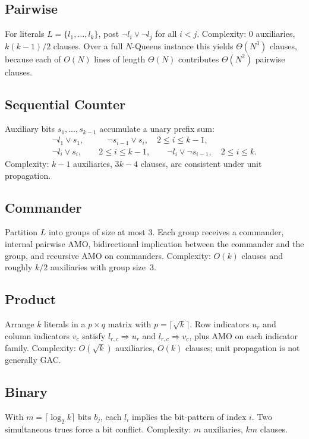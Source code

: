 \documentclass[a4paper,fleqn]{cas-sc}
\begin{document}
\subsection{Pairwise}
For literals $L=\{l_1,\dots,l_k\}$, post $\neg l_i\lor\neg l_j$ for all $i<j$.
Complexity: $0$ auxiliaries, $k(k-1)/2$ clauses.
Over a full $N$-Queens instance this yields $\Theta(N^3)$ clauses, because each of $O(N)$ lines of length $\Theta(N)$ contributes $\Theta(N^2)$ pairwise clauses.

\subsection{Sequential Counter~\cite{sinz2005towards}}
Auxiliary bits $s_1,\dots,s_{k-1}$ accumulate a unary prefix sum:
\begin{align}
\neg l_1\lor s_1, &\qquad
\neg s_{i-1}\lor s_i, \quad 2\le i\le k-1,\\
\neg l_i\lor s_i, &\quad 2\le i\le k-1, \qquad
\neg l_i\lor \neg s_{i-1}, \quad 2\le i\le k.
\end{align}
Complexity: $k-1$ auxiliaries, $3k-4$ clauses, arc consistent under unit propagation.

\subsection{Commander~\cite{klieber2007commander}}
Partition $L$ into groups of size at most $3$.
Each group receives a commander, internal pairwise AMO, bidirectional implication between the commander and the group, and recursive AMO on commanders.
Complexity: $O(k)$ clauses and roughly $k/2$ auxiliaries with group size~$3$.

\subsection{Product~\cite{chen2010new}}
Arrange $k$ literals in a $p\times q$ matrix with $p=\lceil\sqrt{k}\rceil$.
Row indicators $u_r$ and column indicators $v_c$ satisfy $l_{r,c}\Rightarrow u_r$ and $l_{r,c}\Rightarrow v_c$, plus AMO on each indicator family.
Complexity: $O(\sqrt{k})$ auxiliaries, $O(k)$ clauses; unit propagation is not generally GAC.

\subsection{Binary~\cite{frisch2005symmetry}}
With $m=\lceil\log_2 k\rceil$ bits $b_j$, each $l_i$ implies the bit-pattern of index $i$.
Two simultaneous trues force a bit conflict.
Complexity: $m$ auxiliaries, $km$ clauses.
\end{document}
